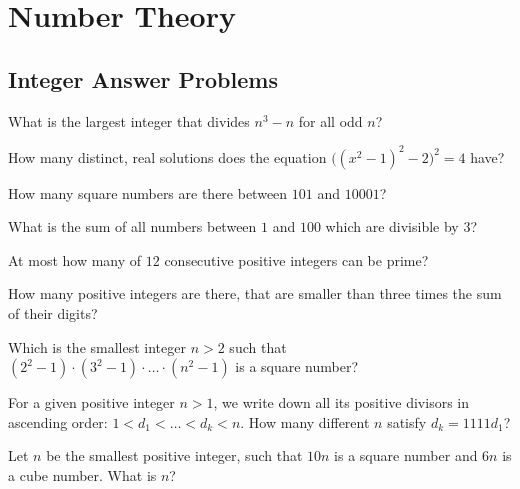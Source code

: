 \documentclass{article}
\begin{document}
\section{Number Theory}
\subsection{Integer Answer Problems}

\begin{problem}
What is the largest integer that divides $n^3-n$ for all odd $n$?
\end{problem}

\begin{problem}
How many distinct, real solutions does the equation $\Big((x^2-1)^2-2\Big)^2 = 4$ have?
\end{problem}

\begin{problem}
How many square numbers are there between $101$ and $10001$?
\end{problem}

\begin{problem}
What is the sum of all numbers between $1$ and $100$ which are divisible by $3$?
\end{problem}

\begin{problem}
At most how many of $12$ consecutive positive integers can be prime?
\end{problem}

\begin{problem}
How many positive integers are there, that are smaller than three times the sum of their digits?
\end{problem}

\begin{problem}
Which is the smallest integer $n > 2$ such that $(2^2-1)\cdot(3^2-1) \cdot \ldots \cdot (n^2-1)$ is a square number?
\end{problem}

\begin{problem}
For a given positive integer $n > 1$, we write down all its positive divisors in ascending order: $1 < d_1 < \ldots < d_k < n$.
How many different $n$ satisfy $d_k = 1111 d_1$?
\end{problem}

\begin{problem}
Let $n$ be the smallest positive integer, such that $10n$ is a square number and $6n$ is a cube number. What is $n$?
\end{problem}
\end{document}
